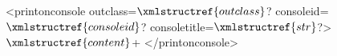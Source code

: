 <printonconsole outclass=$\xmlstructref{outclass}$? consoleid=$\xmlstructref{consoleid}$? consoletitle=$\xmlstructref{str}$?>
  $\xmlstructref{content}$+
</printonconsole>
